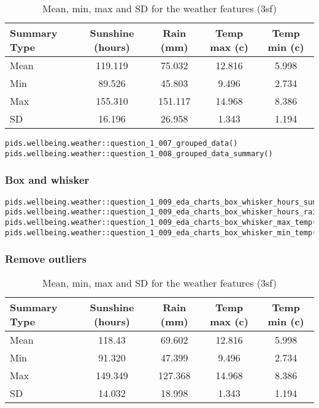 \documentclass[12pt, oneside, openany]{book}
\begin{document}
\begin{table}[h!]
\centering
\begin{tabular}{ |l|c|c|c|c| }
 	\hline
 		Summary Type & Sunshine (hours) & Rain (mm) & Temp max (c) & Temp min (c)\\
 	\hline
 	\hline
    		Mean & 119.119  & 75.032  & 12.816 & 5.998 \\
    		Min & 89.526  & 45.803  & 9.496   & 2.734 \\
    		Max & 155.310 & 151.117  & 14.968  & 8.386 \\
    		SD & 16.196  & 26.958   & 1.343  & 1.194 \\
     \hline
 \end{tabular}
 \caption{Mean, min, max and SD for the weather features (3sf)}
 \label{table:question_1_008_grouped_data_summary_non_scaled}
\end{table}

\begin{verbatim}
pids.wellbeing.weather::question_1_007_grouped_data()
pids.wellbeing.weather::question_1_008_grouped_data_summary()
\end{verbatim}

\subsubsection*{Box and whisker}

\begin{verbatim}
pids.wellbeing.weather::question_1_009_eda_charts_box_whisker_hours_sun()
pids.wellbeing.weather::question_1_009_eda_charts_box_whisker_hours_rain()
pids.wellbeing.weather::question_1_009_eda_charts_box_whisker_max_temp()
pids.wellbeing.weather::question_1_009_eda_charts_box_whisker_min_temp()
\end{verbatim}

\subsubsection*{Remove outliers}

\begin{table}[h!]
	\centering
	\begin{tabular}{ |l|c|c|c|c| }
		\hline
		Summary Type & Sunshine (hours) & Rain (mm) & Temp max (c) & Temp min (c)\\
		\hline
		\hline
		Mean & 118.43  & 69.602  & 12.816 & 5.998 \\
		Min & 91.320  & 47.399  & 9.496   & 2.734 \\
		Max & 149.349 & 127.368  & 14.968  & 8.386 \\
		SD & 14.032  & 18.998   & 1.343  & 1.194 \\
		\hline
	\end{tabular}
	\caption{Mean, min, max and SD for the weather features (3sf)}
	\label{table:question_1_008_grouped_data_summary_non_scaled}
\end{table}
\end{document}
